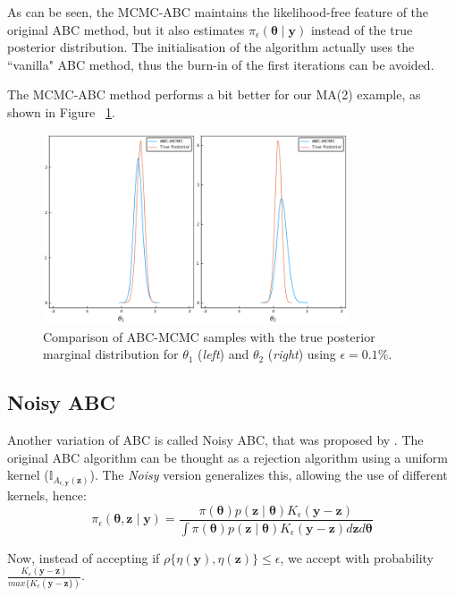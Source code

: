 \documentclass[runningheads]{llncs}
\begin{document}
As can be seen, the MCMC-ABC maintains the likelihood-free
feature of the original ABC method, but it also estimates
$\pi_\epsilon(\bm \theta \mid \bm y)$ instead of the true
posterior distribution. The initialisation of the algorithm
actually uses the ``vanilla" ABC method, thus the burn-in
of the first iterations can be avoided.

The MCMC-ABC method performs a bit better
for our MA(2) example, as shown
in Figure ~\ref{fig:mcmcabc}.

\newpage
\hfill\break
    \begin{figure}[H]
        \centering
        \includegraphics[width=9cm]{images/ABC-MCMC.png}
        \caption{Comparison of ABC-MCMC samples with the true posterior
        marginal distribution for $\theta_1$ (\textit{left}) and
        $\theta_2$ (\textit{right}) using $\epsilon = 0.1\%$.
        }
        \label{fig:mcmcabc}
    \end{figure}

\subsection{Noisy ABC}
\label{subsec:statistical-summaries}

Another variation of ABC is called Noisy ABC, that was
proposed by \citet{Wilkinson2013}. The original ABC algorithm can
be thought as a rejection algorithm using a uniform kernel
($\mathbb I_{A_{\epsilon, \bm y}(\bm z)}$). The \textit{Noisy} version
generalizes this, allowing the use of different kernels, hence:
\begin{equation}
\pi_\epsilon(\bm \theta, \bm z \mid \bm y) = 
\frac{\pi(\bm \theta) p(\bm z \mid \bm \theta)
K_\epsilon(\bm y - \bm z)}
{\int \pi(\bm \theta)
p(\bm z \mid \bm \theta)K_\epsilon(\bm y - \bm z)d\bm z d \bm \theta}
\end{equation}

Now, instead of accepting if
$\rho\{\eta(\bm y),\eta(\bm z)\} \leq \epsilon$, we accept with 
probability
$\frac{K_\epsilon(\bm y - \bm z)}{max\{K_\epsilon(\bm y - \bm z\})}
$.
\hfill\break
\end{document}
